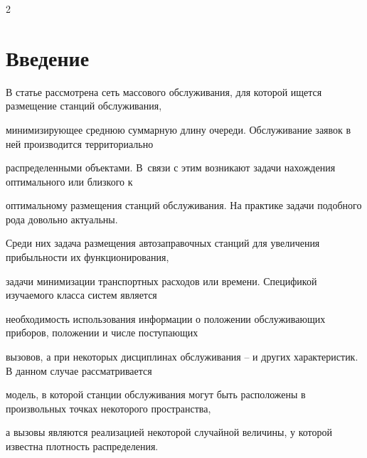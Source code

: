 









      \thispagestyle{headings}





      \begin{multicols}{2}





      \label{st\stat}





\section{Введение}





В статье рассмотрена сеть массового обслуживания, для которой ищется размещение станций обслуживания, 


минимизирующее среднюю суммарную длину очереди. Обслуживание заявок в ней производится территориально 


распределенными объектами. В~связи с этим возникают задачи нахождения оптимального или близкого к 


оптимальному размещения станций обслуживания. На практике задачи подобного рода довольно актуальны. 


Среди них задача размещения автозаправочных станций для увеличения прибыльности их функционирования, 


задачи минимизации транспортных расходов или времени. Спецификой изучаемого класса систем является 


необходимость использования информации о положении обслуживающих приборов, положении и числе поступающих 


вызовов, а при некоторых дисциплинах обслуживания -- и других характеристик. В данном случае рассматривается 


модель, в которой станции обслуживания могут быть расположены в произвольных точках некоторого пространства, 


а вызовы являются реализацией некоторой случайной величины, у которой известна плотность распределения. 



\end{multicols}
